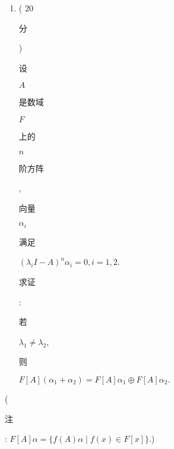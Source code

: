 \documentclass[10pt]{article}
\begin{document}
\begin{enumerate}
  \item ( 20 \begin{CJK}{UTF8}{mj}分\end{CJK}) \begin{CJK}{UTF8}{mj}设\end{CJK} $A$ \begin{CJK}{UTF8}{mj}是数域\end{CJK} $F$ \begin{CJK}{UTF8}{mj}上的\end{CJK} $n$ \begin{CJK}{UTF8}{mj}阶方阵\end{CJK}, \begin{CJK}{UTF8}{mj}向量\end{CJK} $\alpha_{i}$ \begin{CJK}{UTF8}{mj}满足\end{CJK} $\left(\lambda_{i} I-A\right)^{n} \alpha_{i}=0, i=1,2$. \begin{CJK}{UTF8}{mj}求证\end{CJK}: \begin{CJK}{UTF8}{mj}若\end{CJK} $\lambda_{1} \neq \lambda_{2}$, \begin{CJK}{UTF8}{mj}则\end{CJK} $F[A]\left(\alpha_{1}+\alpha_{2}\right)=F[A] \alpha_{1} \oplus F[A] \alpha_{2} .$

\end{enumerate}
(\begin{CJK}{UTF8}{mj}注\end{CJK}: $F[A] \alpha=\{f(A) \alpha \mid f(x) \in F[x]\}$.)
\end{document}
